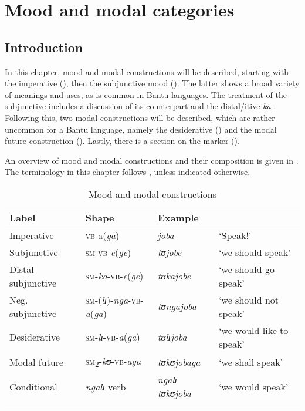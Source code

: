 \chapter{Mood and modal categories}
\label{MoodModal}
\section{Introduction}
In this chapter, mood and modal constructions will be described, starting with the imperative (), then the subjunctive mood (). The latter shows a broad variety of meanings and uses, as is common in Bantu languages. The treatment of the subjunctive includes a discussion of its  counterpart and the distal/itive \textit{ka}-. Following this, two modal constructions will be described, which are rather uncommon for a Bantu language, namely the desiderative () and the modal future construction (). Lastly, there is a section on the  marker ().

An overview of mood and modal constructions and their composition is given in . The terminology in this chapter follows \citet{PalmerF2007}, unless indicated otherwise.

\begin{table}[htb]%
\setlength{\tabcolsep}{2pt}
\begin{tabularx}{\textwidth}{llll}
\lsptoprule
\footnotesize{Label} & \footnotesize{Shape} & \footnotesize{Example}\\
\midrule
Imperative & \textsc{vb}-a(\textit{ga}) & \textit{joba} & \lq Speak!'\\ 
Subjunctive & \textsc{sm}-\textsc{vb}-\textit{e}(\textit{ge}) & \textit{tʊjobe} & \lq we should speak' \\ 
Distal subjunctive & \textsc{sm}-\textit{ka}-\textsc{vb}-\textit{e}(\textit{ge}) & \textit{tʊkajobe} & \lq we should go speak' \\ 
Neg. subjunctive & \textsc{sm}-(\textit{lɪ})-\textit{nga}-\textsc{vb}-\textit{a}(\textit{ga}) & \textit{tʊngajoba} & \lq we should not speak' \\
Desiderative & \textsc{sm}-\textit{lɪ}-\textsc{vb}-\textit{a}(\textit{ga}) & \textit{tʊlɪjoba} & \lq we would like to speak'\\ 
Modal future & \textsc{sm}\textsubscript{2}-\textit{kʊ}-\textsc{vb}-\textit{aga} & \textit{tʊkʊjobaga} & \lq we shall speak'\\ 
Conditional & \textit{ngalɪ} verb & \textit{ngalɪ tʊkʊjoba} & \lq we would speak'\\
\lspbottomrule  
\end{tabularx}
\caption{Mood and modal constructions}\label{tableMoodModalConstructions}
\end{table}
